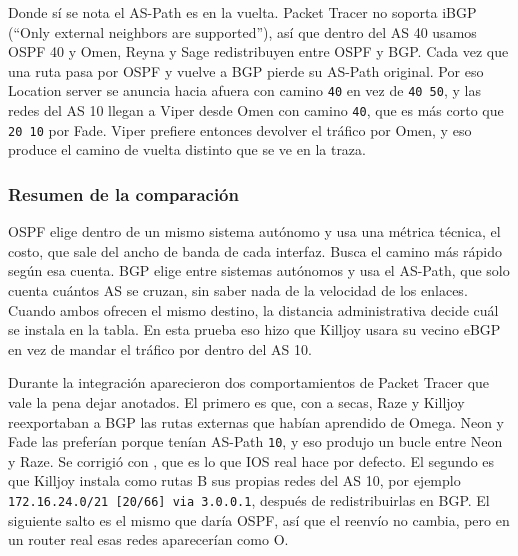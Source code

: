 Donde sí se nota el AS-Path es en la vuelta. Packet Tracer no soporta iBGP (``Only external neighbors are supported''), así que dentro del AS 40 usamos OSPF 40 y Omen, Reyna y Sage redistribuyen entre OSPF y BGP. Cada vez que una ruta pasa por OSPF y vuelve a BGP pierde su AS-Path original. Por eso Location server se anuncia hacia afuera con camino \texttt{40} en vez de \texttt{40 50}, y las redes del AS 10 llegan a Viper desde Omen con camino \texttt{40}, que es más corto que \texttt{20 10} por Fade. Viper prefiere entonces devolver el tráfico por Omen, y eso produce el camino de vuelta distinto que se ve en la traza.

\subsubsection*{Resumen de la comparación}

OSPF elige dentro de un mismo sistema autónomo y usa una métrica técnica, el costo, que sale del ancho de banda de cada interfaz. Busca el camino más rápido según esa cuenta. BGP elige entre sistemas autónomos y usa el AS-Path, que solo cuenta cuántos AS se cruzan, sin saber nada de la velocidad de los enlaces. Cuando ambos ofrecen el mismo destino, la distancia administrativa decide cuál se instala en la tabla. En esta prueba eso hizo que Killjoy usara su vecino eBGP en vez de mandar el tráfico por dentro del AS 10.

Durante la integración aparecieron dos comportamientos de Packet Tracer que vale la pena dejar anotados. El primero es que, con  a secas, Raze y Killjoy reexportaban a BGP las rutas externas que habían aprendido de Omega. Neon y Fade las preferían porque tenían AS-Path \texttt{10}, y eso produjo un bucle entre Neon y Raze. Se corrigió con , que es lo que IOS real hace por defecto. El segundo es que Killjoy instala como rutas B sus propias redes del AS 10, por ejemplo \texttt{172.16.24.0/21 [20/66] via 3.0.0.1}, después de redistribuirlas en BGP. El siguiente salto es el mismo que daría OSPF, así que el reenvío no cambia, pero en un router real esas redes aparecerían como O.
